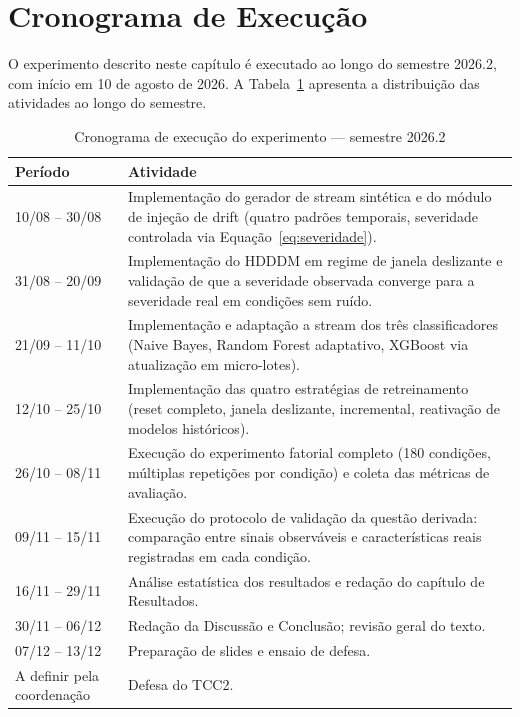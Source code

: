 \section{Cronograma de Execução}
O experimento descrito neste capítulo é executado ao longo do semestre
2026.2, com início em 10 de agosto de 2026. A Tabela~\ref{tab:cronograma}
apresenta a distribuição das atividades ao longo do semestre.
 
\begin{table}[h]
\centering
\caption{Cronograma de execução do experimento — semestre 2026.2}
\label{tab:cronograma}
\begin{tabular}{p{2.6cm}p{9.5cm}}
\toprule
\textbf{Período} & \textbf{Atividade} \\
\midrule
10/08 -- 30/08 & Implementação do gerador de stream sintética e do módulo de
injeção de drift (quatro padrões temporais, severidade controlada via
Equação~\ref{eq:severidade}). \\
31/08 -- 20/09 & Implementação do HDDDM em regime de janela deslizante e
validação de que a severidade observada converge para a severidade real em
condições sem ruído. \\
21/09 -- 11/10 & Implementação e adaptação a stream dos três classificadores
(Naive Bayes, Random Forest adaptativo, XGBoost via atualização em
micro-lotes). \\
12/10 -- 25/10 & Implementação das quatro estratégias de retreinamento (reset
completo, janela deslizante, incremental, reativação de modelos
históricos). \\
26/10 -- 08/11 & Execução do experimento fatorial completo (180 condições,
múltiplas repetições por condição) e coleta das métricas de avaliação. \\
09/11 -- 15/11 & Execução do protocolo de validação da questão derivada:
comparação entre sinais observáveis e características reais registradas em
cada condição. \\
16/11 -- 29/11 & Análise estatística dos resultados e redação do capítulo de
Resultados. \\
30/11 -- 06/12 & Redação da Discussão e Conclusão; revisão geral do
texto. \\
07/12 -- 13/12 & Preparação de slides e ensaio de defesa. \\
A definir pela coordenação & Defesa do TCC2. \\
\bottomrule
\end{tabular}
\end{table}